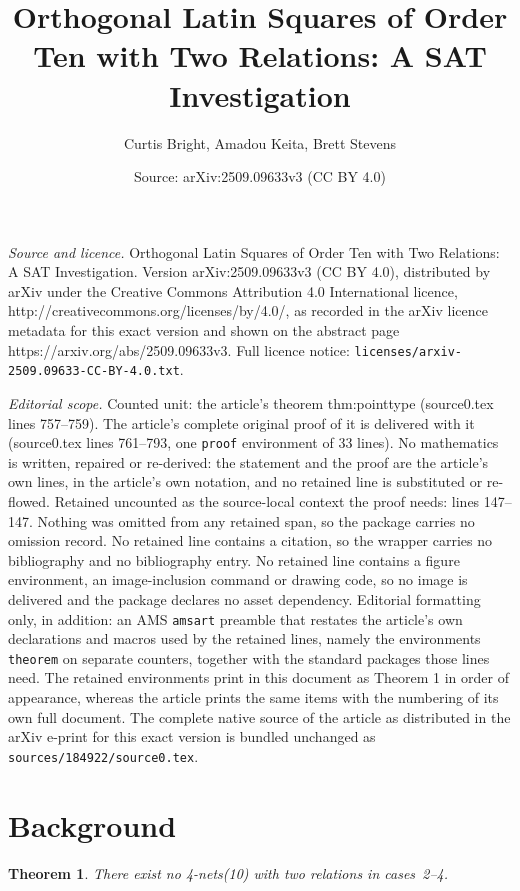 \documentclass[10pt,a4paper]{amsart}
\title{Orthogonal Latin Squares of Order Ten with Two Relations: A SAT Investigation}
\author{Curtis Bright, Amadou Keita, Brett Stevens}
\date{Source: arXiv:2509.09633v3 (CC BY 4.0)}
\newtheorem{theorem}{Theorem}
\begin{document}
\maketitle

\noindent\emph{Source and licence.} Orthogonal Latin Squares of Order Ten with Two Relations: A SAT Investigation. Version arXiv:2509.09633v3 (CC BY 4.0), distributed by arXiv under the Creative Commons Attribution 4.0 International licence, http://creativecommons.org/licenses/by/4.0/, as recorded in the arXiv licence metadata for this exact version and shown on the abstract page https://arxiv.org/abs/2509.09633v3. Full licence notice: \texttt{licenses/arxiv-2509.09633-CC-BY-4.0.txt}.\par\smallskip

\noindent\textit{Editorial scope.} Counted unit: the article's theorem thm:pointtype (source0.tex lines 757--759). The article's complete original proof of it is delivered with it (source0.tex lines 761--793, one \texttt{proof} environment of 33 lines). No mathematics is written, repaired or re-derived: the statement and the proof are the article's own lines, in the article's own notation, and no retained line is substituted or re-flowed.  Retained uncounted as the source-local context the proof needs: lines 147--147.  Nothing was omitted from any retained span, so the package carries no omission record.  No retained line contains a citation, so the wrapper carries no bibliography and no bibliography entry.  No retained line contains a figure environment, an image-inclusion command or drawing code, so no image is delivered and the package declares no asset dependency.  Editorial formatting only, in addition: an AMS \texttt{amsart} preamble that restates the article's own declarations and macros used by the retained lines, namely the environments \texttt{theorem} on separate counters, together with the standard packages those lines need.  The retained environments print in this document as Theorem 1 in order of appearance, whereas the article prints the same items with the numbering of its own full document.  The complete native source of the article as distributed in the arXiv e-print for this exact version is bundled unchanged as \texttt{sources/184922/source0.tex}.
\section{Background}\label{sec:background}

\begin{theorem}\label{thm:pointtype}
There exist no 4-nets(10) with two relations in cases~2--4.
\end{theorem}
\end{document}
